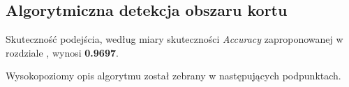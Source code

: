 \subsection{Algorytmiczna detekcja obszaru kortu}

Skuteczność podejścia, według miary skuteczności \textit{Accuracy} zaproponowanej w rozdziale , wynosi \textbf{0.9697}.

Wysokopoziomy opis algorytmu został zebrany w następujących podpunktach. 
